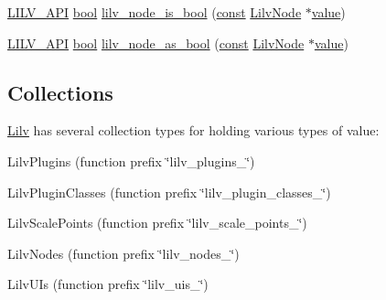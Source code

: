 \begin{DoxyCompactItemize}
\item 
\hyperlink{lilv_8h_aa5182eee7ddff96862d0171967ee6f77}{L\+I\+L\+V\+\_\+\+A\+PI} \hyperlink{mac_2config_2i386_2lib-src_2libsoxr_2soxr-config_8h_abb452686968e48b67397da5f97445f5b}{bool} \hyperlink{group__lilv_gad31f809d6311309d75a54f1d14ff9781}{lilv\+\_\+node\+\_\+is\+\_\+bool} (\hyperlink{getopt1_8c_a2c212835823e3c54a8ab6d95c652660e}{const} \hyperlink{lilv_8h_ae183dca3dca5368d34dbd863a405437b}{Lilv\+Node} $\ast$\hyperlink{lib_2expat_8h_a4a30a13b813682e68c5b689b45c65971}{value})
\item 
\hyperlink{lilv_8h_aa5182eee7ddff96862d0171967ee6f77}{L\+I\+L\+V\+\_\+\+A\+PI} \hyperlink{mac_2config_2i386_2lib-src_2libsoxr_2soxr-config_8h_abb452686968e48b67397da5f97445f5b}{bool} \hyperlink{group__lilv_gaca452e807f7c451491075772eb6bb92a}{lilv\+\_\+node\+\_\+as\+\_\+bool} (\hyperlink{getopt1_8c_a2c212835823e3c54a8ab6d95c652660e}{const} \hyperlink{lilv_8h_ae183dca3dca5368d34dbd863a405437b}{Lilv\+Node} $\ast$\hyperlink{lib_2expat_8h_a4a30a13b813682e68c5b689b45c65971}{value})
\end{DoxyCompactItemize}
\subsection*{Collections}
\label{_amgrpa9fc91939a389c7c73e7a3f3cbf411cd}%
\hyperlink{namespace_lilv}{Lilv} has several collection types for holding various types of value\+: 
\begin{DoxyItemize}
\item Lilv\+Plugins (function prefix \char`\"{}lilv\+\_\+plugins\+\_\+\char`\"{}) 
\item Lilv\+Plugin\+Classes (function prefix \char`\"{}lilv\+\_\+plugin\+\_\+classes\+\_\+\char`\"{}) 
\item Lilv\+Scale\+Points (function prefix \char`\"{}lilv\+\_\+scale\+\_\+points\+\_\+\char`\"{}) 
\item Lilv\+Nodes (function prefix \char`\"{}lilv\+\_\+nodes\+\_\+\char`\"{}) 
\item Lilv\+U\+Is (function prefix \char`\"{}lilv\+\_\+uis\+\_\+\char`\"{}) 
\end{DoxyItemize}

